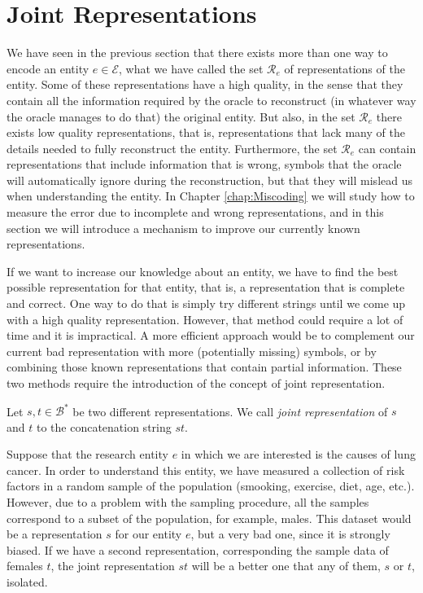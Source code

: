%
%

\section{Joint Representations}
\label{sec:descriptions_joint_topic}

We have seen in the previous section that there exists more than one way to encode an entity $e \in \mathcal{E}$, what we have called the set $\mathcal{R}_e$ of representations of the entity. Some of these representations have a high quality, in the sense that they contain all the information required by the oracle to reconstruct (in whatever way the oracle manages to do that) the original entity. But also, in the set $\mathcal{R}_e$ there exists low quality representations, that is, representations that lack many of the details needed to fully reconstruct the entity. Furthermore, the set $\mathcal{R}_e$ can contain representations that include information that is wrong, symbols that the oracle will automatically ignore during the reconstruction, but that they will mislead us when understanding the entity. In Chapter \ref{chap:Miscoding} we will study how to measure the error due to incomplete and wrong representations, and in this section we will introduce a mechanism to improve our currently known representations.

If we want to increase our knowledge about an entity, we have to find the best possible representation for that entity, that is, a representation that is complete and correct. One way to do that is simply try different strings until we come up with a high quality representation. However, that method could require a lot of time and it is impractical. A more efficient approach would be to complement our current bad representation with more (potentially missing) symbols, or by combining those known representations that contain partial information. These two methods require the introduction of the concept of joint representation.

\begin{definition}
Let $s, t \in \mathcal{B}^\ast$ be two different representations. We call \emph{joint representation} of $s$ and $t$ to the concatenation string $st$.
\end{definition}

\begin{example}
\label{ex:lung_cancer}
Suppose that the research entity $e$ in which we are interested is the causes of lung cancer. In order to understand this entity, we have measured a collection of risk factors in a random sample of the population (smooking, exercise, diet, age, etc.). However, due to a problem with the sampling procedure, all the samples correspond to a subset of the population, for example, males. This dataset would be a representation $s$ for our entity $e$, but a very bad one, since it is strongly biased. If we have a second representation, corresponding the sample data of females $t$, the joint representation $st$ will be a better one that any of them, $s$ or $t$, isolated.
\end{example}

